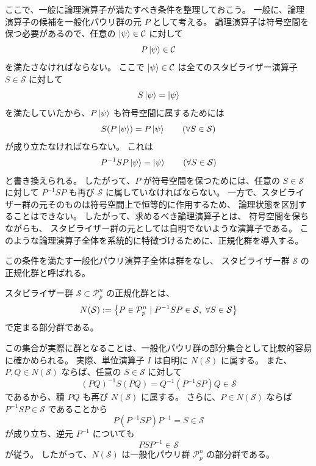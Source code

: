 \documentclass[../master.tex]{subfiles}
\begin{document}
ここで、一般に論理演算子が満たすべき条件を整理しておこう。
一般に、論理演算子の候補を一般化パウリ群の元 $P$ として考える。
論理演算子は符号空間を保つ必要があるので、任意の $\ket{\psi}\in\mathcal{C}$ に対して
\begin{equation}
    P\ket{\psi}\in\mathcal{C}
\end{equation}
を満たさなければならない。
ここで $\ket{\psi}\in\mathcal{C}$ は全てのスタビライザー演算子 $S\in\mathcal{S}$ に対して
\begin{equation}
    S\ket{\psi}=\ket{\psi}
\end{equation}
を満たしていたから、$P\ket{\psi}$ も符号空間に属するためには
\begin{equation}
    S(P\ket{\psi})=P\ket{\psi}\qquad (\forall S\in\mathcal{S})
\end{equation}
が成り立たなければならない。
これは
\begin{equation}
    P^{-1}SP\ket{\psi}=\ket{\psi}\qquad (\forall S\in\mathcal{S})
\end{equation}
と書き換えられる。
したがって、$P$ が符号空間を保つためには、任意の $S\in\mathcal{S}$ に対して
$P^{-1}SP$ も再び $\mathcal{S}$ に属していなければならない。
一方で、スタビライザー群の元そのものは符号空間上で恒等的に作用するため、
論理状態を区別することはできない。
したがって、求めるべき論理演算子とは、
符号空間を保ちながらも、
スタビライザー群の元としては自明でないような演算子である。
このような論理演算子全体を系統的に特徴づけるために、正規化群を導入する。

この条件を満たす一般化パウリ演算子全体は群をなし、
スタビライザー群 $\mathcal{S}$ の正規化群と呼ばれる。
\begin{NoteBox}[title={正規化群}]{}
    スタビライザー群 $\mathcal{S}\subset\mathcal{P}_p^n$ の正規化群とは、
    \begin{equation}
        N(\mathcal{S})
        :=
        \qty{
            P\in\mathcal{P}_p^n
            \mid
            P^{-1}SP\in\mathcal{S},\ \forall S\in\mathcal{S}}
    \end{equation}
    で定まる部分群である。
\end{NoteBox}
この集合が実際に群となることは、一般化パウリ群の部分集合として比較的容易に確かめられる。
実際、単位演算子 $I$ は自明に $N(\mathcal{S})$ に属する。
また、$P,Q\in N(\mathcal{S})$ ならば、任意の $S\in\mathcal{S}$ に対して
\begin{equation}
    (PQ)^{-1}S(PQ)=Q^{-1}(P^{-1}SP)Q\in\mathcal{S}
\end{equation}
であるから、積 $PQ$ も再び $N(\mathcal{S})$ に属する。
さらに、$P\in N(\mathcal{S})$ ならば $P^{-1}SP\in\mathcal{S}$ であることから
\begin{equation}
    P(P^{-1}SP)P^{-1}=S\in\mathcal{S}
\end{equation}
が成り立ち、逆元 $P^{-1}$ についても
\begin{equation}
    P S P^{-1}\in\mathcal{S}
\end{equation}
が従う。
したがって、$N(\mathcal{S})$ は一般化パウリ群 $\mathcal{P}_p^n$ の部分群である。
\end{document}
